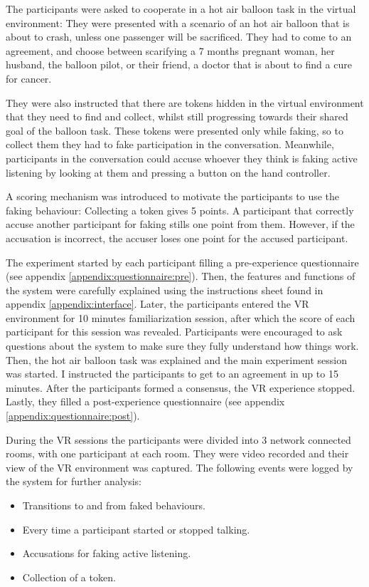 \documentclass[]{simple-thesis}
\begin{document}
The participants were asked to cooperate in a hot air balloon task \citep{Howes2012} in the virtual environment:
They were presented with a scenario of an hot air balloon that is about to crash, unless one passenger will be sacrificed.
They had to come to an agreement, and choose between scarifying a 7 months pregnant woman, her husband, the balloon pilot, or their friend, a doctor that is about to find a cure for cancer.

They were also instructed that there are tokens hidden in the virtual environment that they need to find and collect, whilst still progressing towards their shared goal of the balloon task.
These tokens were presented only while faking, so to collect them they had to fake participation in the conversation.
Meanwhile, participants in the conversation could accuse whoever they think is faking active listening by looking at them and pressing a button on the hand controller.

A scoring mechanism was introduced to motivate the participants to use the faking behaviour:
Collecting a token gives 5 points.
A participant that correctly accuse another participant for faking stills one point from them.
However, if the accusation is incorrect, the accuser loses one point for the accused participant.

The experiment started by each participant filling a pre-experience questionnaire (see appendix \ref{appendix:questionnaire:pre}).
Then, the features and functions of the system were carefully explained using the instructions sheet found in appendix \ref{appendix:interface}.
Later, the participants entered the VR environment for 10 minutes familiarization session, after which the score of each participant for this session was revealed.
Participants were encouraged to ask questions about the system to make sure they fully understand how things work.
Then, the hot air balloon task was explained and the main experiment session was started.
I instructed the participants to get to an agreement in up to 15 minutes.
After the participants formed a consensus, the VR experience stopped.
Lastly, they filled a post-experience questionnaire (see appendix \ref{appendix:questionnaire:post}).

During the VR sessions the participants were divided into 3 network connected rooms, with one participant at each room.
They were video recorded and their view of the VR environment was captured.
The following events were logged by the system for further analysis:

\begin{itemize}
  \item Transitions to and from faked behaviours.
  \item Every time a participant started or stopped talking.
  \item Accusations for faking active listening.
  \item Collection of a token.
\end{itemize}
\end{document}
